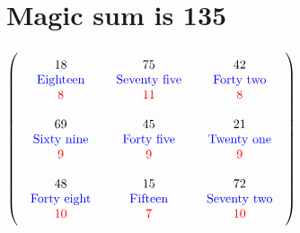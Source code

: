 \documentclass{article}
\begin{document}
\vspace{2em} 
\section{Magic sum is 135}$ \left( \begin{array}{ccc}
\begin{array}{c}
\rule{0pt}{1.5em}18 \\ 
\text{\color{blue}Eighteen} \\ 
\color{red}8 \vspace{.5em} 
\end{array} & \begin{array}{c}
\rule{0pt}{1.5em}75 \\ 
\text{\color{blue}Seventy five} \\ 
\color{red}11 \vspace{.5em} 
\end{array} & \begin{array}{c}
\rule{0pt}{1.5em}42 \\ 
\text{\color{blue}Forty two} \\ 
\color{red}8 \vspace{.5em} 
\end{array}\\ 
\begin{array}{c}
\rule{0pt}{1.5em}69 \\ 
\text{\color{blue}Sixty nine} \\ 
\color{red}9 \vspace{.5em} 
\end{array} & \begin{array}{c}
\rule{0pt}{1.5em}45 \\ 
\text{\color{blue}Forty five} \\ 
\color{red}9 \vspace{.5em} 
\end{array} & \begin{array}{c}
\rule{0pt}{1.5em}21 \\ 
\text{\color{blue}Twenty one} \\ 
\color{red}9 \vspace{.5em} 
\end{array}\\ 
\begin{array}{c}
\rule{0pt}{1.5em}48 \\ 
\text{\color{blue}Forty eight} \\ 
\color{red}10 \vspace{.5em} 
\end{array} & \begin{array}{c}
\rule{0pt}{1.5em}15 \\ 
\text{\color{blue}Fifteen} \\ 
\color{red}7 \vspace{.5em} 
\end{array} & \begin{array}{c}
\rule{0pt}{1.5em}72 \\ 
\text{\color{blue}Seventy two} \\ 
\color{red}10 \vspace{.5em} 
\end{array}\end{array} \right) $
\end{document}
